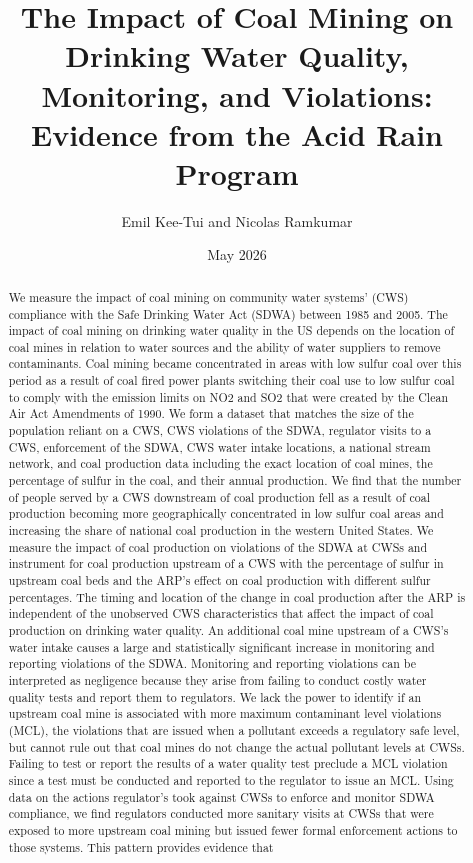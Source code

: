 \documentclass{article}
\begin{document}
\title{The Impact of Coal Mining on Drinking Water Quality, Monitoring, and Violations: Evidence from the Acid Rain Program}
\author[1]{Emil Kee-Tui and Nicolas Ramkumar}
\date{May 2026}
\maketitle
\thispagestyle{empty}
\doublespacing

\begin{center}\begin{abstract}
		\noindent We measure the impact of coal mining on community water systems’ (CWS) compliance with the Safe Drinking Water Act (SDWA) between 1985 and 2005. The impact of coal mining on drinking water quality in the US depends on the location of coal mines in relation to water sources and the ability of water suppliers to remove contaminants. Coal mining became concentrated in areas with low sulfur coal over this period as a result of coal fired power plants switching their coal use to low sulfur coal to comply with the emission limits on NO2 and SO2 that were created by the Clean Air Act Amendments of 1990. We form a dataset that matches the size of the population reliant on a CWS, CWS violations of the SDWA, regulator visits to a CWS, enforcement of the SDWA, CWS water intake locations, a national stream network, and coal production data including the exact location of coal mines, the percentage of sulfur in the coal, and their annual production. We find that the number of people served by a CWS downstream of coal production fell as a result of coal production becoming more geographically concentrated in low sulfur coal areas and increasing the share of national coal production in the western United States. We measure the impact of coal production on violations of the SDWA at CWSs and instrument for coal production upstream of a CWS with the percentage of sulfur in upstream coal beds and the ARP’s effect on coal production with different sulfur percentages. The timing and location of the change in coal production after the ARP is independent of the unobserved CWS characteristics that affect the impact of coal production on drinking water quality. An additional coal mine upstream of a CWS's water intake causes a large and statistically significant increase in monitoring and reporting violations of the SDWA. Monitoring and reporting violations can be interpreted as negligence because they arise from failing to conduct costly water quality tests and report them to regulators. We lack the power to identify if an upstream coal mine is associated with more maximum contaminant level violations (MCL), the violations that are issued when a pollutant exceeds a regulatory safe level, but cannot rule out that coal mines do not change the actual pollutant levels at CWSs. Failing to test or report the results of a water quality test preclude a MCL violation since a test must be conducted and reported to the regulator to issue an MCL. Using data on the actions regulator’s took against CWSs to enforce and monitor SDWA compliance, we find regulators conducted more sanitary visits at CWSs that were exposed to more upstream coal mining but issued fewer formal enforcement actions to those systems. This pattern provides evidence that 
\end{abstract}
\end{center}
\end{document}
